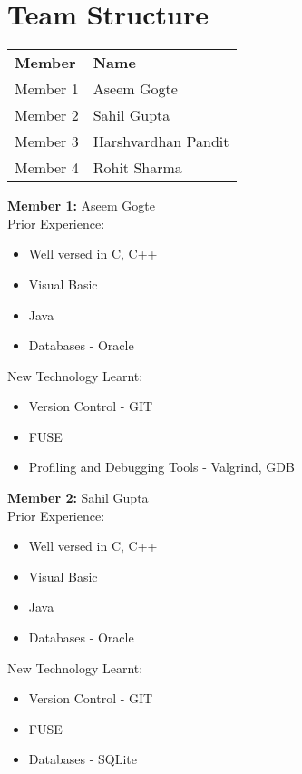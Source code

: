 \section{Team Structure}

\begin{center}
\begin{tabular}{p{3cm}p{5cm}}

\textbf{Member} & \textbf{Name} \\ 
Member 1 & Aseem Gogte \\
Member 2 & Sahil Gupta\\
Member 3 & Harshvardhan Pandit \\
Member 4 & Rohit Sharma \\

\end{tabular}
\end{center}

\noindent \textbf{Member 1:} Aseem Gogte \\
Prior Experience:
\begin{itemize}
\item Well versed in C, C++
\item Visual Basic
\item Java
\item Databases - Oracle
\end{itemize}
New Technology Learnt:
\begin{itemize}
\item Version Control - GIT
\item FUSE
\item Profiling and Debugging Tools - Valgrind, GDB
\end{itemize}

\noindent \textbf{Member 2:} Sahil Gupta \\
Prior Experience:
\begin{itemize}
\item Well versed in C, C++
\item Visual Basic
\item Java
\item Databases - Oracle
\end{itemize}
New Technology Learnt:
\begin{itemize}
\item Version Control - GIT
\item FUSE
\item Databases - SQLite
\end{itemize}

